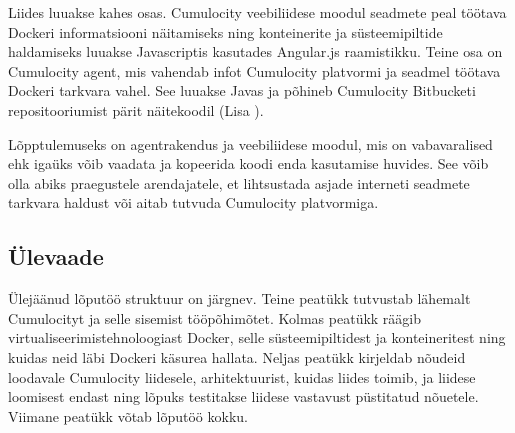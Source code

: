 \documentclass[12pt]{article}
\begin{document}
  Liides luuakse kahes osas. Cumulocity veebiliidese moodul seadmete peal töötava
  Dockeri informatsiooni näitamiseks ning konteinerite ja süsteemipiltide haldamiseks
  luuakse Javascriptis kasutades Angular.js raamistikku. Teine osa on Cumulocity agent,
  mis vahendab infot Cumulocity platvormi ja seadmel töötava Dockeri tarkvara vahel.
  See luuakse Javas ja põhineb Cumulocity Bitbucketi
  repositooriumist pärit näitekoodil (Lisa ).

  Lõpptulemuseks on agentrakendus ja veebiliidese moodul, mis on vabavaralised ehk igaüks võib
  vaadata ja kopeerida koodi enda kasutamise huvides. See võib olla abiks praegustele
  arendajatele, et lihtsustada asjade interneti seadmete tarkvara haldust või aitab
  tutvuda Cumulocity platvormiga.


  \subsection{Ülevaade}
  Ülejäänud lõputöö struktuur on järgnev.
  Teine peatükk tutvustab lähemalt Cumulocityt ja selle sisemist tööpõhimõtet. Kolmas peatükk
  räägib virtualiseerimistehnoloogiast Docker, selle süsteemipiltidest ja konteineritest
  ning kuidas neid läbi Dockeri käsurea hallata. Neljas peatükk kirjeldab nõudeid loodavale
  Cumulocity liidesele, arhitektuurist, kuidas liides toimib, ja liidese loomisest endast
  ning lõpuks testitakse liidese vastavust püstitatud nõuetele. Viimane peatükk võtab
  lõputöö kokku.






\end{document}
